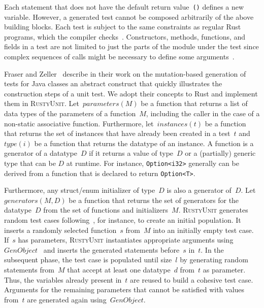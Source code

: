 \documentclass[paper=a4,%
  twoside,%
  BCOR4mm,%
  abstract=true,%
  toc=bibliography,%
  chapterprefix=true,%
  toc=bibliographynumbered,%
  open=right,%
  english,%
  pagesize=pdftex]{scrreprt}
\newcommand{\tech}{\textsc{RustyUnit}\xspace}
\begin{document}
Each statement that does not have the default return value~\texttt{()} defines a new variable. However, a generated test cannot be composed arbitrarily of the above building blocks. Each test is subject to the same constraints as regular Rust programs, which the compiler checks~\cite{Tonella2004}. Constructors, methods, functions, and fields in a test are not limited to just the parts of the module under the test since complex sequences of calls might be necessary to define some arguments~\cite{Fraser2012}.



Fraser and Zeller~\cite{Fraser2012} describe in their work on the mutation-based generation of tests for Java classes an abstract construct that quickly illustrates the construction steps of a unit test. We adopt their concepts to Rust and implement them in \tech. Let~$parameters(M)$ be a function that returns a list of data types of the parameters of a function~$M$, including the caller in the case of a non-static associative function. Furthermore, let~$instances(t)$ be a function that returns the set of instances that have already been created in a test~$t$ and~$type(i)$ be a function that returns the datatype of an instance. A function is a generator of a datatype~$D$ if it returns a value of type~$D$ or a (partially) generic type that can be $D$ at runtime. For instance, \texttt{Option<i32>} generally can be derived from a function that is declared to return \texttt{Option<T>}. 

Furthermore, any struct/enum initializer of type~$D$ is also a generator of~$D$. Let~$generators(M,D)$ be a function that returns the set of generators for the datatype~$D$ from the set of functions and initializers~$M$. \tech generates random test cases following~, for instance, to create an initial population. It inserts a randomly selected function~$s$ from~$M$ into an initially empty test case. If~$s$ has parameters, \tech instantiates appropriate arguments using $GenObject$~ and inserts the generated statements before~$s$ in~$t$. In the subsequent phase, the test case is populated until size~$l$ by generating random statements from~$M$ that accept at least one datatype~$d$ from~$t$ as parameter. Thus, the variables already present in~$t$ are reused to build a cohesive test case. Arguments for the remaining parameters that cannot be satisfied with values from~$t$ are generated again using~$GenObject$. 
\end{document}
